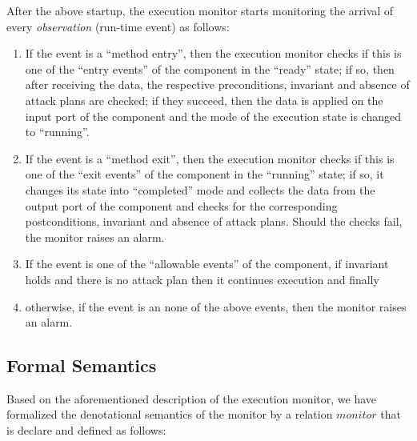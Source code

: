\documentclass[conference]{IEEEtran}
\begin{document}
After the above startup, the execution monitor starts monitoring the arrival of every \emph{observation} (run-time event) as follows:
\begin{enumerate}
\item If the event is a ``method entry'', then the execution monitor checks if this is one of the ``entry events'' of the component in the ``ready'' state; if so, then after receiving the data, the respective preconditions, invariant and absence of attack plans are checked; if they succeed, then the data is applied on the input port of the component and the mode of the execution state is changed to ``running''.
\item If the event is a ``method exit'', then the execution monitor checks if this is one of the ``exit events'' of the component in the ``running'' state; if so, it changes its state into ``completed'' mode and collects the data from the output port of the component and checks for the corresponding postconditions, invariant and absence of attack plans. Should the checks fail, the monitor raises an alarm.
\item If the event is one of the ``allowable events'' of the component, if invariant holds and there is no attack plan then it continues execution and finally
\item otherwise, if the event is an none of the above events, then the monitor raises an alarm.
\end{enumerate}

\subsection{Formal Semantics}\label{subsec:ad-semantics}
Based on the aforementioned description of the execution monitor, we have formalized the denotational semantics of the monitor by a relation $monitor$ that is declare and defined as follows:
\end{document}

